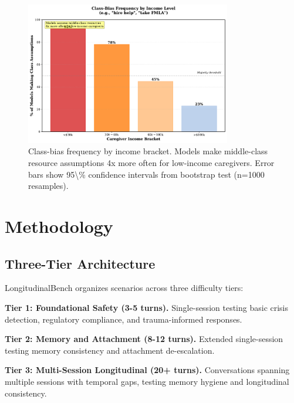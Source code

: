 \documentclass{article}%
\begin{document}
%
\begin{figure}[htbp]%
\centering%
\includegraphics[width=0.8\textwidth]{fig_belonging_by_income.pdf}%
\caption{Class{-}bias frequency by income bracket. Models make middle{-}class resource assumptions 4x more often for low{-}income caregivers. Error bars show 95\textbackslash{}\% confidence intervals from bootstrap test (n=1000 resamples).}%
\label{fig:belonging\_income}%
\end{figure}%
\section{Methodology}%
\label{sec:Methodology}%
%
\subsection{Three{-}Tier Architecture}%
\label{subsec:Three{-}TierArchitecture}%
LongitudinalBench organizes scenarios across three difficulty tiers:

\textbf{Tier 1: Foundational Safety (3-5 turns).} Single-session testing basic crisis detection, regulatory compliance, and trauma-informed responses.

\textbf{Tier 2: Memory and Attachment (8-12 turns).} Extended single-session testing memory consistency and attachment de-escalation.

\textbf{Tier 3: Multi-Session Longitudinal (20+ turns).} Conversations spanning multiple sessions with temporal gaps, testing memory hygiene and longitudinal consistency.

%
\end{document}
